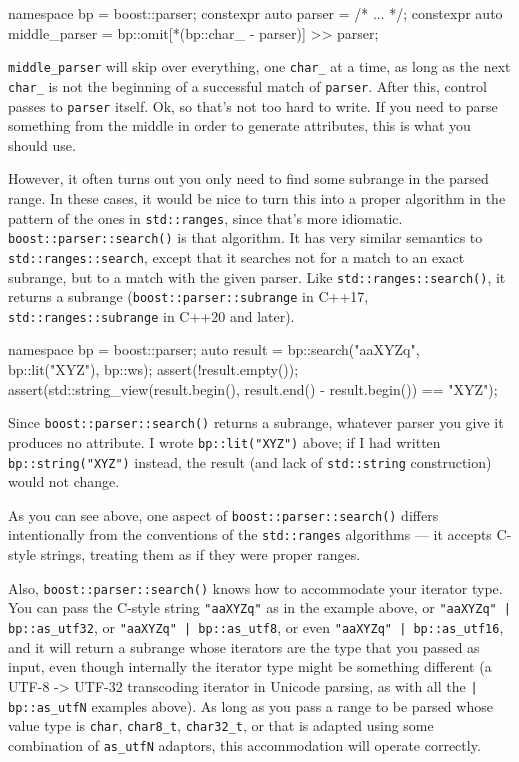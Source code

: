 \begin{code}
namespace bp = boost::parser;
constexpr auto parser = /* ... */;
constexpr auto middle_parser = bp::omit[*(bp::char_ - parser)] >> parser;
\end{code}

\texttt{middle\_parser} will skip over everything, one \texttt{char\_} at a time, as long as the next \texttt{char\_} is not the beginning of a successful match of \texttt{parser}. After this, control passes to \texttt{parser} itself. Ok, so that's not too hard to write. If you need to parse something from the middle in order to generate attributes, this is what you should use.

However, it often turns out you only need to find some subrange in the parsed range. In these cases, it would be nice to turn this into a proper algorithm in the pattern of the ones in \texttt{std::ranges}, since that's more idiomatic. \texttt{boost::parser::search()} is that algorithm. It has very similar semantics to \texttt{std::ranges::search}, except that it searches not for a match to an exact subrange, but to a match with the given parser. Like \texttt{std::ranges::search()}, it returns a subrange (\texttt{boost::parser::subrange} in C++17, \texttt{std::ranges::subrange} in C++20 and later).

\begin{code}
namespace bp = boost::parser;
auto result = bp::search("aaXYZq", bp::lit("XYZ"), bp::ws);
assert(!result.empty());
assert(std::string_view(result.begin(), result.end() - result.begin()) == "XYZ");
\end{code}

Since \texttt{boost::parser::search()} returns a subrange, whatever parser you give it produces no attribute. I wrote \texttt{bp::lit("XYZ")} above; if I had written \texttt{bp::string("XYZ")} instead, the result (and lack of \texttt{std::string} construction) would not change.

As you can see above, one aspect of \texttt{boost::parser::search()} differs intentionally from the conventions of the \texttt{std::ranges} algorithms --- it accepts C-style strings, treating them as if they were proper ranges.

Also, \texttt{boost::parser::search()} knows how to accommodate your iterator type. You can pass the C-style string \texttt{"aaXYZq"} as in the example above, or \texttt{"aaXYZq" | bp::as\_utf32}, or \texttt{"aaXYZq" | bp::as\_utf8}, or even \texttt{"aaXYZq" | bp::as\_utf16}, and it will return a subrange whose iterators are the type that you passed as input, even though internally the iterator type might be something different (a UTF-8 -> UTF-32 transcoding iterator in Unicode parsing, as with all the \texttt{| bp::as\_utfN} examples above). As long as you pass a range to be parsed whose value type is \texttt{char}, \texttt{char8\_t}, \texttt{char32\_t}, or that is adapted using some combination of \texttt{as\_utfN} adaptors, this accommodation will operate correctly.

